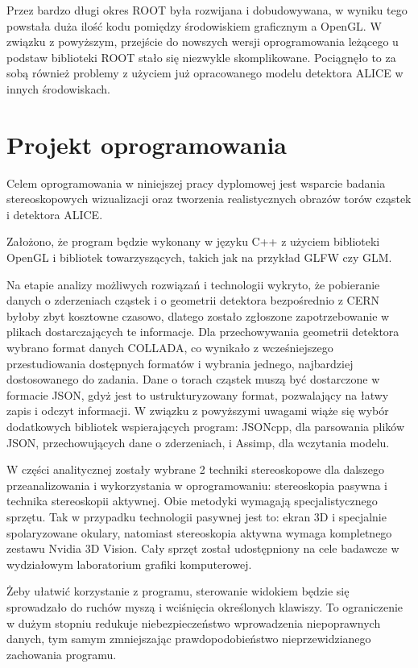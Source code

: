 Przez bardzo długi okres ROOT była rozwijana i dobudowywana, w wyniku tego powstała duża ilość kodu pomiędzy środowiskiem graficznym a OpenGL. W związku z powyższym, przejście do nowszych wersji oprogramowania leżącego u podstaw biblioteki ROOT stało się niezwykle skomplikowane. Pociągnęło to za sobą również problemy z użyciem już opracowanego modelu detektora ALICE w innych środowiskach.

\newpage
\section{Projekt oprogramowania}
Celem oprogramowania w niniejszej pracy dyplomowej jest wsparcie badania stereoskopowych wizualizacji oraz tworzenia realistycznych obrazów torów cząstek i detektora ALICE.

Założono, że program będzie wykonany w języku C++ z użyciem biblioteki OpenGL i bibliotek towarzyszących, takich jak na przykład GLFW czy GLM.

Na etapie analizy możliwych rozwiązań i technologii wykryto, że pobieranie danych o zderzeniach cząstek i o geometrii detektora bezpośrednio z CERN byłoby zbyt kosztowne czasowo, dlatego zostało zgłoszone zapotrzebowanie w plikach dostarczających te informacje. Dla przechowywania geometrii detektora wybrano format danych COLLADA, co wynikało z wcześniejszego przestudiowania dostępnych formatów i wybrania jednego, najbardziej dostosowanego do zadania. Dane o torach cząstek muszą być dostarczone w formacie JSON, gdyż jest to ustrukturyzowany format, pozwalający na łatwy zapis i odczyt informacji. W związku z powyższymi uwagami wiąże się wybór dodatkowych bibliotek wspierających program: JSONcpp, dla parsowania plików JSON, przechowujących dane o zderzeniach, i Assimp, dla wczytania modelu.

W części analitycznej zostały wybrane 2 techniki stereoskopowe dla dalszego przeanalizowania i wykorzystania w oprogramowaniu: stereoskopia pasywna i technika stereoskopii aktywnej. Obie metodyki wymagają specjalistycznego sprzętu. Tak w przypadku technologii pasywnej jest to: ekran 3D i specjalnie spolaryzowane okulary, natomiast stereoskopia aktywna wymaga kompletnego zestawu Nvidia 3D Vision. Cały sprzęt został udostępniony na cele badawcze w wydziałowym laboratorium grafiki komputerowej.

Żeby ułatwić korzystanie z programu, sterowanie widokiem będzie się sprowadzało do ruchów myszą i wciśnięcia określonych klawiszy. To ograniczenie w dużym stopniu redukuje niebezpieczeństwo wprowadzenia niepoprawnych danych, tym samym zmniejszając prawdopodobieństwo nieprzewidzianego zachowania programu.

